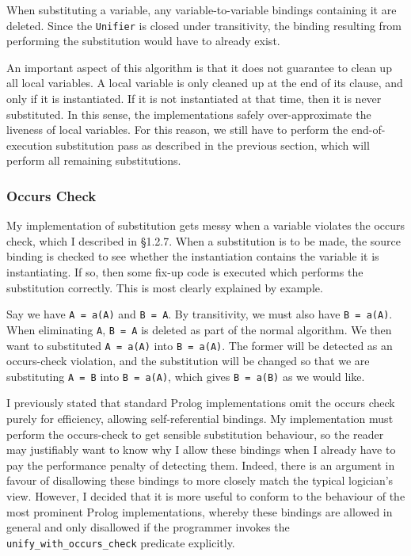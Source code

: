 \documentclass[12pt]{article}
\begin{document}
When substituting a variable, any variable-to-variable bindings containing it are deleted.
Since the \verb|Unifier| is closed under transitivity, the binding resulting from performing the substitution would have to already exist.

An important aspect of this algorithm is that it does not guarantee to clean up all local variables.
A local variable is only cleaned up at the end of its clause, and only if it is instantiated.
If it is not instantiated at that time, then it is never substituted.
In this sense, the implementations safely over-approximate the liveness of local variables.
For this reason, we still have to perform the end-of-execution substitution pass as described in the previous section, which will perform all remaining substitutions.

\subsubsection{Occurs Check}

My implementation of substitution gets messy when a variable violates the occurs check, which I described in \S1.2.7. 
When a substitution is to be made, the source binding is checked to see whether the instantiation contains the variable it is instantiating. 
If so, then some fix-up code is executed which performs the substitution correctly. 
This is most clearly explained by example.

Say we have \verb|A = a(A)| and \verb|B = A|. By transitivity, we must also have \verb|B = a(A)|. 
When eliminating \verb|A|, \verb|B = A| is deleted as part of the normal algorithm. 
We then want to substituted \verb|A = a(A)| into \verb|B = a(A)|. 
The former will be detected as an occurs-check violation, and the substitution will be changed so that we are substituting \verb|A = B| into \verb|B = a(A)|, which gives \verb|B = a(B)| as we would like.

I previously stated that standard Prolog implementations omit the occurs check purely for efficiency, allowing self-referential bindings.
My implementation must perform the occurs-check to get sensible substitution behaviour, so the reader may justifiably want to know why I allow these bindings when I already have to pay the performance penalty of detecting them. 
Indeed, there is an argument in favour of disallowing these bindings to more closely match the typical logician's view. 
However, I decided that it is more useful to conform to the behaviour of the most prominent Prolog implementations, whereby these bindings are allowed in general and only disallowed if the programmer invokes the \verb|unify_with_occurs_check| predicate explicitly. 
\end{document}
